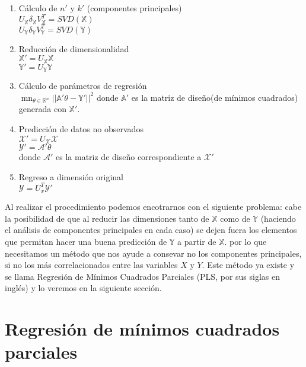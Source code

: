 \begin{enumerate}
\item Cálculo de $n'$ y $k'$ (componentes principales) \\
	$U_{\mathbb{X}}\delta_{\mathbb{X}}V_{\mathbb{X}}^{T} = SVD(\mathbb{X})$\\
	$U_{\mathbb{Y}}\delta_{\mathbb{Y}}V_{\mathbb{Y}}^{T} = SVD(\mathbb{Y})$

\item Reducción de dimensionalidad\\
	$\mathbb{X'} = U_{\mathbb{X}}\mathbb{X}$\\
	$\mathbb{Y'} = U_{\mathbb{Y}}\mathbb{Y}$
	

\item Cálculo de parámetros de regresión\\
	$\mathop{m\acute{i}n}_{\theta \in \mathbb{R}^{n}} ||\mathbb{A'}\theta - \mathbb{Y'}||^{2}$
	donde $\mathbb{A'}$ es la matriz de diseño(de mínimos cuadrados) generada con $\mathbb{X'}$.

\item Predicción de datos no observados\\
	$\mathcal{X'} = U_{\mathcal{X}} \mathcal{X}$\\
	$\mathcal{Y'} = \mathcal{A'} \theta$\\
	donde $\mathcal{A'}$ es la matriz de diseño correspondiente a $\mathcal{X'}$
	
\item Regreso a dimensión original\\ 
	$\mathcal{Y} = U_{x}^{T}\mathcal{Y'} $

\end{enumerate}

Al realizar el procedimiento podemos encotrarnos con el siguiente problema: cabe la posibilidad de que al reducir las dimensiones tanto de $\mathbb{X}$ como de $\mathbb{Y}$ (haciendo el análisis de componentes principales en cada caso) se dejen fuera los elementos que permitan hacer una buena predicción de $\mathbb{Y}$ a partir de $\mathbb{X}$. por lo que necesitamos un método que nos ayude a consevar no los componentes principales, si no los más correlacionados entre las variables $X$ y $Y$. Este método ya existe y se llama Regresión de Mínimos Cuadrados Parciales (PLS, por sus siglas en inglés) y lo veremos en la siguiente sección. 

\section{Regresión de mínimos cuadrados parciales}

